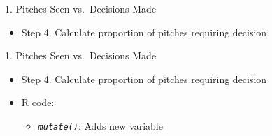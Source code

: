 \begin{frame}[fragile]{1. Pitches Seen vs.~Decisions Made}

\begin{itemize}
\tightlist
\item
  Step 4. Calculate proportion of pitches requiring decision
\end{itemize}

\footnotesize

\begin{Shaded}
\end{Shaded}

\end{frame}

\begin{frame}[fragile]{1. Pitches Seen vs.~Decisions Made}

\begin{itemize}
\tightlist
\item
  Step 4. Calculate proportion of pitches requiring decision
\item
  R code:

  \begin{itemize}
  \tightlist
  \item
    \emph{\texttt{mutate()}}: Adds new variable
  \end{itemize}
\end{itemize}

\footnotesize

\begin{Shaded}
\end{Shaded}

\end{frame}


